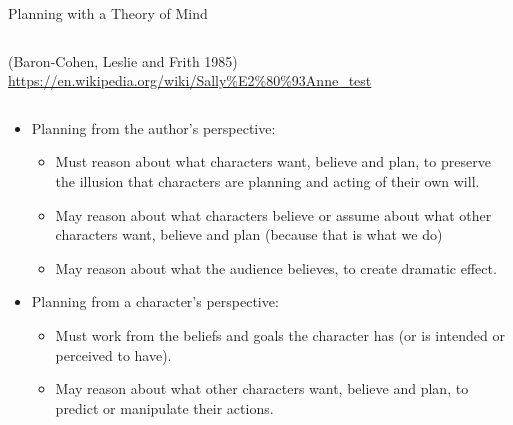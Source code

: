 \documentclass[utf8,13pt]{beamer}
\begin{document}
\begin{frame}{Planning with a Theory of Mind}
\begin{columns}
\begin{column}{.315\linewidth}
      \begin{minipage}{\linewidth}
        \tiny
        (Baron-Cohen, Leslie and Frith 1985)\\
        \url{https://en.wikipedia.org/wiki/Sally\%E2\%80\%93Anne_test}
      \end{minipage}
    \end{column}
  \end{columns}
\end{frame}

\begin{frame}
  \begin{itemize}
  \item Planning from the author's perspective:
    \begin{itemize}
    \item Must reason about what characters want, believe and plan,
      to preserve the illusion that characters are planning and acting
      of their own will.
    \item May reason about what characters believe or assume about
      what other characters want, believe and plan (because that is
      what we do)
    \item May reason about what the audience believes,
      to create dramatic effect.
    \end{itemize}
  \item Planning from a character's perspective:
    \begin{itemize}
    \item Must work from the beliefs and goals the character has
      (or is intended or perceived to have).
    \item May reason about what other characters want, believe
      and plan, to predict or manipulate their actions.
    \end{itemize}
  \end{itemize}
\end{frame}
\end{document}
